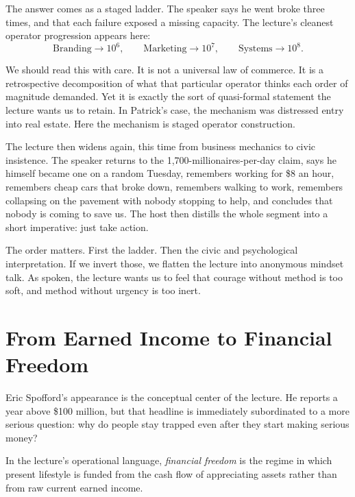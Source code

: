 The answer comes as a staged ladder. The speaker says he went broke three times, and that each failure exposed a missing capacity. The lecture's cleanest operator progression appears here:
\begin{equation}
\text{Branding}\rightarrow 10^6,\qquad
\text{Marketing}\rightarrow 10^7,\qquad
\text{Systems}\rightarrow 10^8.
\end{equation}

We should read this with care. It is not a universal law of commerce. It is a retrospective decomposition of what that particular operator thinks each order of magnitude demanded. Yet it is exactly the sort of quasi-formal statement the lecture wants us to retain. In Patrick's case, the mechanism was distressed entry into real estate. Here the mechanism is staged operator construction.

The lecture then widens again, this time from business mechanics to civic insistence. The speaker returns to the 1{,}700-millionaires-per-day claim, says he himself became one on a random Tuesday, remembers working for \$8 an hour, remembers cheap cars that broke down, remembers walking to work, remembers collapsing on the pavement with nobody stopping to help, and concludes that nobody is coming to save us. The host then distills the whole segment into a short imperative: just take action.

The order matters. First the ladder. Then the civic and psychological interpretation. If we invert those, we flatten the lecture into anonymous mindset talk. As spoken, the lecture wants us to feel that courage without method is too soft, and method without urgency is too inert.

\section{From Earned Income to Financial Freedom}

Eric Spofford's appearance is the conceptual center of the lecture. He reports a year above \$100 million, but that headline is immediately subordinated to a more serious question: why do people stay trapped even after they start making serious money?

\begin{definition}
In the lecture's operational language, \emph{financial freedom} is the regime in which present lifestyle is funded from the cash flow of appreciating assets rather than from raw current earned income.
\end{definition}

